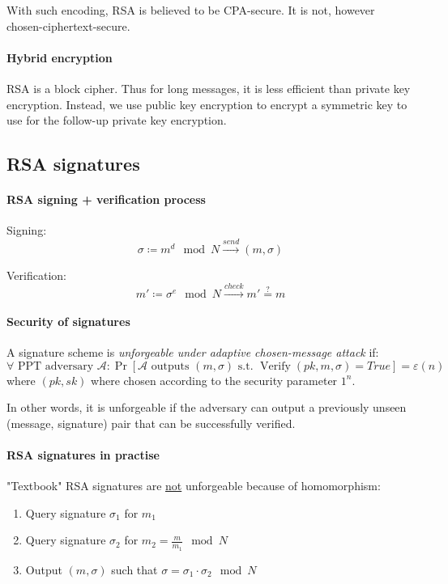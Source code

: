 With such encoding, RSA is believed to be CPA-secure. It is not, however chosen-ciphertext-secure.

\paragraph{Hybrid encryption} RSA is a block cipher. Thus for long messages, it is less efficient than private key encryption. Instead, we use public key encryption to encrypt a symmetric key to use for the follow-up private key encryption.



\pagebreak
\subsection{RSA signatures}

\paragraph{RSA signing + verification process}\mbox{}

Signing: $$ \sigma \coloneqq m^d \mod N \xrightarrow{send} (m, \sigma) $$

Verification: $$ m' \coloneqq \sigma^e \mod N \xrightarrow{check} m' \stackrel{?}{=} m $$

\paragraph{Security of signatures}
A signature scheme is \textit{unforgeable under adaptive chosen-message attack} if:
$$ \forall \text{ PPT adversary } \mathcal{A} : \Pr[\mathcal{A} \text{ outputs } (m,\sigma) \text{ s.t. } \operatorname{Verify}(pk, m, \sigma)=True ] = \varepsilon(n) $$
where $(pk, sk)$ where chosen according to the security parameter $1^n$.

In other words, it is unforgeable if the adversary can output a previously unseen (message, signature) pair that can be successfully verified.

\paragraph{RSA signatures in practise} "Textbook" RSA signatures are \underline{not} unforgeable because of homomorphism:
\begin{enumerate}
    \item Query signature $\sigma_1$ for $m_1$
    \item Query signature $\sigma_2$ for $m_2 = \frac{m}{m_1} \mod N$
    \item Output $(m, \sigma)$ such that $\sigma = \sigma_1 \cdot \sigma_2 \mod N$
\end{enumerate}

